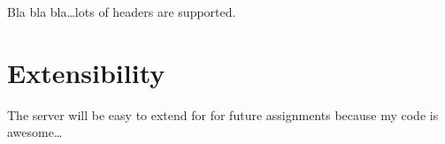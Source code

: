 \documentclass{sig-alternate}
\begin{document}
Bla bla bla\ldots lots of headers are supported.


\section{Extensibility}

The server will be easy to extend for for future assignments because my code
is awesome\ldots


%

\end{document}
